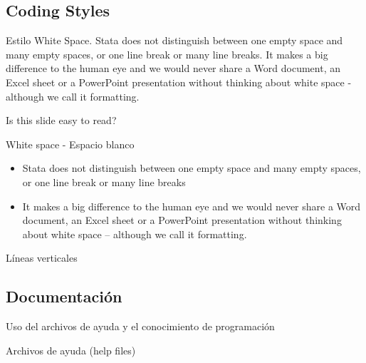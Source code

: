 \documentclass[11pt, aspectratio=169, compress]{beamer}
\begin{document}
\subsection{Coding Styles}
\begin{frame}{Estilo}
	White Space. Stata does not distinguish between one empty space and many empty spaces, or one line break or many line breaks. It makes a big difference to the human eye and we would never share a Word document, an Excel sheet or a PowerPoint presentation without thinking about white space - although we call it formatting.

	Is this slide easy to read?
\end{frame}
\begin{frame}{White space - Espacio blanco}
	\begin{itemize}
		\item Stata does not distinguish between one empty space and many empty spaces, or one line break or many line breaks

		\item It makes a big difference to the human eye and we would never share a Word document, an Excel sheet or a PowerPoint presentation without thinking about white space – although we call it formatting.
	\end{itemize}
\end{frame}
\begin{frame}{Líneas verticales}
	
\end{frame}
\subsection{Documentación}
\begin{frame}{Uso del archivos de ayuda y el conocimiento de programación}
	
\end{frame}
\begin{frame}{Archivos de ayuda (help files)}
	
\end{frame}
\end{document}
